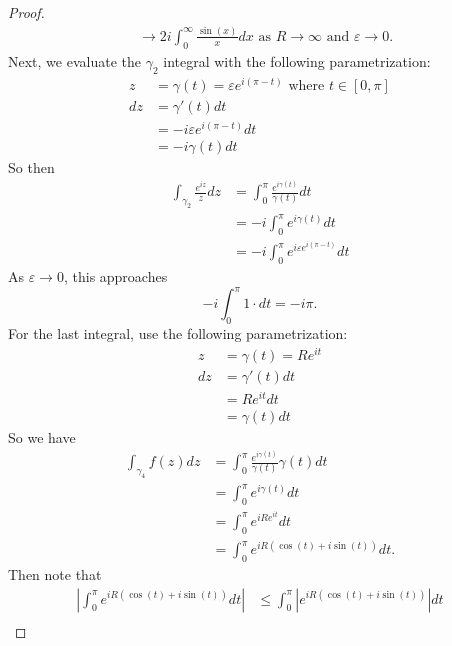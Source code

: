 \documentclass[12pt]{article}
\begin{document}
\begin{proof}
\begin{align*}
                                                                                       & \to 2i \int^{\infty}_0 \frac{\sin (x)}{x}dx \text{ as } R \to \infty \text{ and } \varepsilon \to 0.
  \end{align*}
  Next, we evaluate the $\gamma_2$ integral with the following parametrization: 
  \begin{align*}
    z &=\gamma (t)= \varepsilon e^{i(\pi - t)} \text{ where } t \in [0,\pi]\\
    dz &= \gamma '(t)dt \\ 
       &= -i \varepsilon e^{i(\pi - t)} dt \\
       &= -i \gamma (t) dt
  \end{align*}
  So then
  \begin{align*}
  \int_{\gamma_2} \frac{e^{iz}}{z}dz &= \int^{\pi}_0 \frac{e^{i \gamma (t)}}{\gamma (t)}dt \\
                                     &= -i \int^{\pi}_0 e^{i \gamma (t)}dt \\
                                     &= -i \int^{\pi}_0 e^{i \varepsilon e^{i (\pi - t)}}dt
  \end{align*}
  As $\varepsilon \to 0$, this approaches 
  \begin{equation*}
    -i \int^{\pi}_0 1 \cdot dt = -i \pi.
  \end{equation*}
  For the last integral, use the following parametrization:
  \begin{align*}
    z &= \gamma(t)=Re^{it} \\
    dz &= \gamma ' (t)dt \\
       &= Re^{it}dt \\
       &= \gamma (t) dt
  \end{align*}
  So we have 
  \begin{align*}
    \int_{\gamma_4} f(z)dz &= \int^{\pi}_0 \frac{e^{i \gamma (t)}}{\gamma (t)} \gamma (t) dt \\
                           &= \int^{\pi}_0 e^{i \gamma (t)} dt \\
                           &= \int^{\pi}_0 e^{iRe^{it}} dt \\
                           &= \int^{\pi}_0 e^{iR(\cos (t) + i \sin (t))}dt. 
  \end{align*}
  Then note that 
  \begin{align*}
    \left\lvert \int^{\pi}_0 e^{iR(\cos (t) + i \sin (t))}dt \right\rvert & \leq \int^{\pi}_0 \left\lvert e^{iR(\cos (t) + i \sin (t))} \right \rvert dt \\

\end{align*}
\end{proof}
\end{document}
